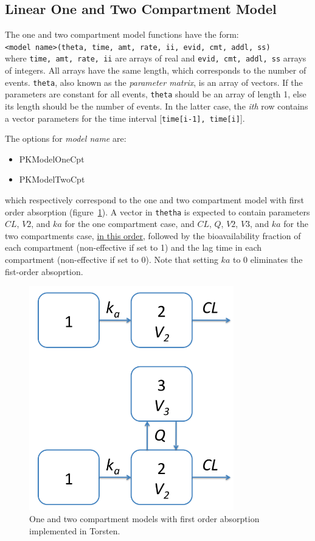 \documentclass[11pt]{amsart}
\begin{document}
\subsection*{Linear One and Two Compartment Model}

The one and two compartment model functions have the form: \\

\texttt{<model name>(theta, time, amt, rate, ii, evid, cmt, addl, ss)} \\

where \texttt{time, amt, rate, ii} are arrays of real and \texttt{evid, cmt, addl, ss} arrays of integers. All arrays have the same length, which corresponds to the number of events. \texttt{theta}, also known as the \textit{parameter matrix}, is an array of vectors. If the parameters are constant for all events, \texttt{theta} should be an array of length 1, else its length should be the number of events. In the latter case, the \textit{ith} row contains a vector parameters for the time interval [\texttt{time[i-1], time[i]}].

The options for \textit{model name} are:
\begin{itemize}
  \item PKModelOneCpt
  \item PKModelTwoCpt
\end{itemize}
which respectively correspond to the one and two compartment model with first order absorption (figure~\ref{cptModels}). A vector in \texttt{thetha} is expected to contain parameters $CL$, $V2$, and $ka$ for the one compartment case, and $CL$, $Q$, $V2$, $V3$, and $ka$ for the two compartments case, \underline{in this order}, followed by the bioavailability fraction of each compartment (non-effective if set to 1) and the lag time in each compartment (non-effective if set to 0). Note that setting $ka$ to 0 eliminates the fist-order absoprtion.

\begin{figure}[htbp]
\includegraphics[width=3.5in,trim=0in 0in 0 0in]{graphics/cptModels.png}
\caption{One and two compartment models with first order absorption implemented in Torsten.}
\label{cptModels}
\end{figure}
\end{document}

